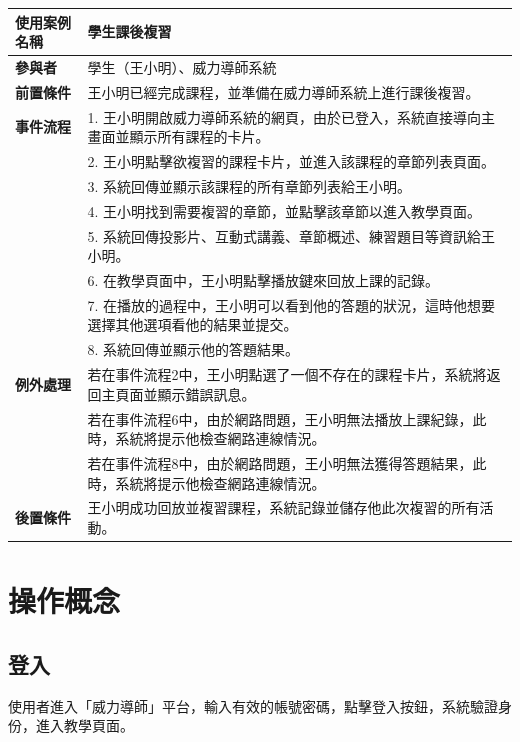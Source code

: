 \documentclass[12pt]{article}
\begin{document}
\begin{table}[H]
  \centering
  \begin{tabular}{|l|p{14cm}|}
  \hline
  \textbf{使用案例名稱} & 學生課後複習 \\ 
  \hline
  \textbf{參與者} & 學生（王小明）、威力導師系統 \\ 
  \hline
  \textbf{前置條件} & 王小明已經完成課程，並準備在威力導師系統上進行課後複習。 \\ 
  \hline
  \textbf{事件流程} 
  & 1. 王小明開啟威力導師系統的網頁，由於已登入，系統直接導向主畫面並顯示所有課程的卡片。 \\
  & 2. 王小明點擊欲複習的課程卡片，並進入該課程的章節列表頁面。 \\
  & 3. 系統回傳並顯示該課程的所有章節列表給王小明。 \\
  & 4. 王小明找到需要複習的章節，並點擊該章節以進入教學頁面。 \\
  & 5. 系統回傳投影片、互動式講義、章節概述、練習題目等資訊給王小明。 \\
  & 6. 在教學頁面中，王小明點擊播放鍵來回放上課的記錄。 \\
  & 7. 在播放的過程中，王小明可以看到他的答題的狀況，這時他想要選擇其他選項看他的結果並提交。 \\
  & 8. 系統回傳並顯示他的答題結果。 \\
  \hline
  \textbf{例外處理} 
  & 若在事件流程2中，王小明點選了一個不存在的課程卡片，系統將返回主頁面並顯示錯誤訊息。 \\
  & 若在事件流程6中，由於網路問題，王小明無法播放上課紀錄，此時，系統將提示他檢查網路連線情況。 \\
  & 若在事件流程8中，由於網路問題，王小明無法獲得答題結果，此時，系統將提示他檢查網路連線情況。 \\
  \hline
  \textbf{後置條件} 
  & 王小明成功回放並複習課程，系統記錄並儲存他此次複習的所有活動。 \\
  \hline
  \end{tabular}
\end{table}
\newpage

\section{操作概念}

\subsection{登入}

使用者進入「威力導師」平台，輸入有效的帳號密碼，點擊登入按鈕，系統驗證身份，進入教學頁面。
\end{document}
